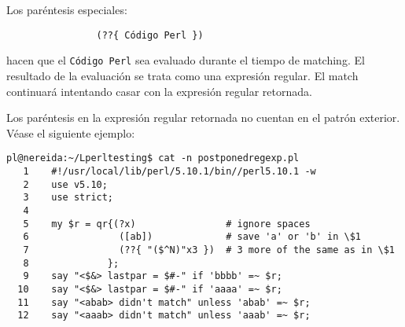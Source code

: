 Los paréntesis especiales:
\begin{verbatim}
                (??{ Código Perl })
\end{verbatim}
hacen que el \verb|Código Perl| sea evaluado durante el tiempo de matching.
El resultado de la evaluación se trata como una expresión regular. El match continuará 
intentando casar con la expresión regular retornada.


Los paréntesis en la expresión regular retornada no cuentan
en el patrón exterior. Véase el siguiente 
ejemplo:

\begin{latexonly}
\begin{verbatim}
pl@nereida:~/Lperltesting$ cat -n postponedregexp.pl
   1    #!/usr/local/lib/perl/5.10.1/bin//perl5.10.1 -w
   2    use v5.10;
   3    use strict;
   4  
   5    my $r = qr{(?x)                # ignore spaces
   6                ([ab])             # save 'a' or 'b' in \$1
   7                (??{ "($^N)"x3 })  # 3 more of the same as in \$1
   8              };
   9    say "<$&> lastpar = $#-" if 'bbbb' =~ $r;
  10    say "<$&> lastpar = $#-" if 'aaaa' =~ $r;
  11    say "<abab> didn't match" unless 'abab' =~ $r;
  12    say "<aaab> didn't match" unless 'aaab' =~ $r;
\end{verbatim}
\end{latexonly}
